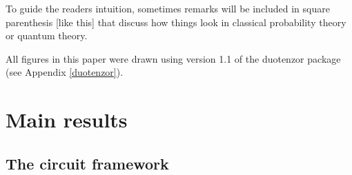 \documentclass[10pt]{article}
\begin{document}
To guide the readers intuition, sometimes remarks will be included in square parenthesis [like this] that discuss how things look in classical probability theory or quantum theory.

All figures in this paper were drawn using version 1.1 of the duotenzor package (see Appendix \ref{duotenzor}).



\section{Main results}

\subsection{The circuit framework}
\end{document}
